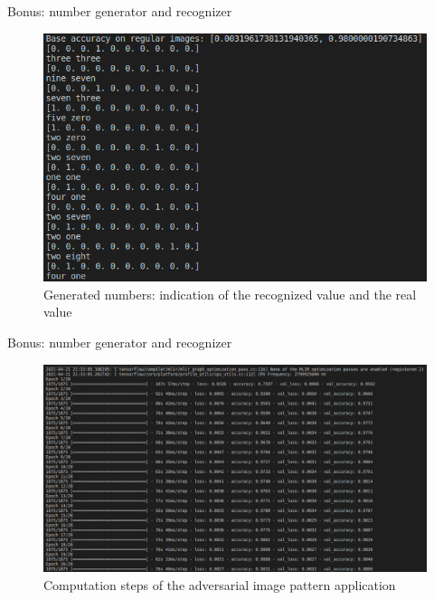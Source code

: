 \documentclass[8pt]{beamer}
\begin{document}
\begin{frame}{Bonus: number generator and recognizer}
\begin{figure} 
    \includegraphics[scale=0.3]{images/immagini_matrix/valori_numeri_matrice.png}
    \vspace*{0mm}
    \caption{Generated numbers: indication of the recognized value and the real value}
\end{figure}
\end{frame}

\begin{frame}{Bonus: number generator and recognizer}
\begin{figure} 
    \includegraphics[scale=0.244]{images/immagini_matrix/step_matrix_computation.png}
    \vspace*{-5mm}
    \caption{Computation steps of the adversarial image pattern application}
\end{figure}
\end{frame}
\end{document}
